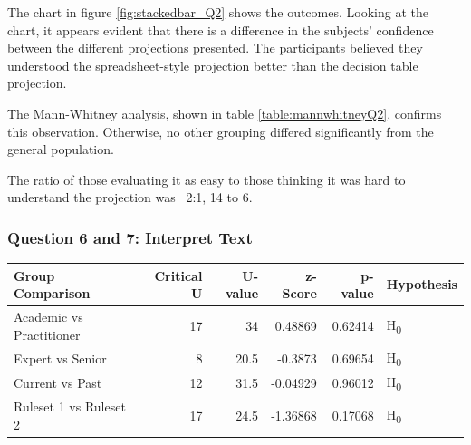 The chart in figure \ref{fig:stackedbar_Q2} shows the outcomes.
Looking at the chart, it appears evident that there is a difference in the subjects' confidence between the different projections presented.
The participants believed they understood the spreadsheet-style projection better than the decision table projection.

The Mann-Whitney analysis, shown in table \ref{table:mannwhitneyQ2}, confirms this observation.
Otherwise, no other grouping differed significantly from the general population.

The ratio of those evaluating it as easy to those thinking it was hard to understand the projection was ~2:1, 14 to 6.

\subsubsection{Question 6 and 7: Interpret Text}
\noindent\begin{minipage}{\linewidth}
    \centering
    \label{fig:stackedbar_Q3}
    
    \begin{tabular}{ |l ||r |r |r | r|l | } 
        \hline
        Group Comparison                 & Critical U & U-value & z-Score  & p-value & Hypothesis         \\
        \hline
        \hline
        Academic vs Practitioner         & 17         & 34      &  0.48869 & 0.62414 & H\textsubscript{0} \\ 
        \hline
        Expert vs Senior                 & 8          & 20.5    &  -0.3873 & 0.69654 & H\textsubscript{0} \\ 
        \hline
        Current vs Past                  & 12         & 31.5    &  -0.04929& 0.96012 & H\textsubscript{0} \\ 
        \hline
        Ruleset 1 vs Ruleset 2           & 17         & 24.5    &  -1.36868& 0.17068 & H\textsubscript{0} \\ 
        \hline
    \end{tabular}
    \label{table:mannwhitneyQ3}
\end{minipage} 


